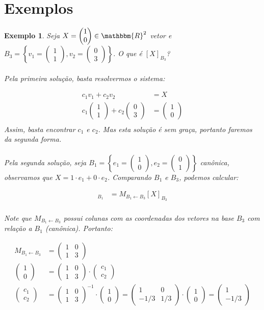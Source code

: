 \documentclass{article}
\newcommand{\REAL} {\mathbbm{R}}
\newcommand{\mudabase}[3] {#1_{#2 \leftarrow #3}}
\newcommand{\vetor}[2] {\begin{pmatrix}#1\\#2\end{pmatrix}} %
\newcommand{\matriz}[4] {\begin{pmatrix}#1&#2\\#3&#4\end{pmatrix}}
\newtheorem{example}{Exemplo}[section]
\begin{document}
    \section{Exemplos}
        \begin{example}
            Seja $X = \vetor{1}{0} \in \REAL^2$ vetor e $B_3 = \left\{ v_1 = \vetor{1}{1}, v_2 = \vetor{0}{3} \right\}$.
            O que é $[X]_{B_3}$?

            \paragraph{}
            Pela primeira solução, basta resolvermos o sistema:

            \begin{align*}
                c_1v_1 + c_2v_2 &= X\\
                c_1\vetor{1}{1} + c_2\vetor{0}{3} &= \vetor{1}{0}\\
            \end{align*}
            Assim, basta encontrar $c_1$ e $c_2$. Mas esta solução é sem graça, portanto
            faremos da segunda forma.

            \paragraph{}
            Pela segunda solução, seja $B_1 = \left\{ e_1 = \vetor{1}{0}, e_2 = \vetor{0}{1} \right\}$ canônica, observamos
            que $X = 1 \cdot e_1 + 0 \cdot e_2$. Comparando $B_1$ e $B_3$, podemos calcular:

            \begin{align*}
                [X]_{B_1} &= \mudabase{M}{B_1}{B_3} [X]_{B_3}\\
            \end{align*}

            Note que $\mudabase{M}{B_1}{B_3}$ possui colunas com as coordenadas dos vetores na base $B_3$
            com relação a $B_1$ (canônica). Portanto:

            \begin{align*}
                \mudabase{M}{B_1}{B_3} &= \matriz{1}{0}{1}{3}\\
                \vetor{1}{0} &= \matriz{1}{0}{1}{3} \cdot \vetor{c_1}{c_2}\\
                \vetor{c_1}{c_2} &= \matriz{1}{0}{1}{3}^{-1} \cdot \vetor{1}{0} = \matriz{1}{0}{-1/3}{1/3} \cdot \vetor{1}{0} = \vetor{1}{-1/3}
            \end{align*}
        \end{example}
\end{document}
